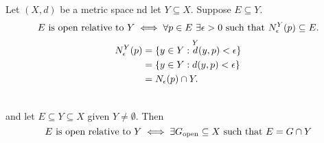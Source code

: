 \begin{remark}
    Let $(X,d)$ be a metric space nd let $Y \subseteq X.$ Suppose $E \subseteq Y.$
    $$\text{$E$ is open relative to $Y$} \iff \forall p \in E ~\exists \epsilon > 0 \text{ such that } N_{\epsilon}^{Y}(p) \subseteq E.$$
    \begin{align*}
        N_{\epsilon}^{Y}(p) &= \{y \in Y : \overset{Y}{d}(y, p) < \epsilon\} \\
        &= \{y \in Y : d(y, p) < \epsilon\} \\
        &= N_{\epsilon}(p) \cap Y.
    \end{align*}
\end{remark}

\begin{theorem} \leavevmode \\
    \label{thm2.30}
    \routineMS and let $E\subseteq Y \subseteq X$ given $Y \not = \emptyset$. Then
    $$\text{$E$ is open relative to $Y \iff \exists G_{\text{open}} \subseteq X \text{ such that } E = G \cap Y$}$$
\end{theorem}

